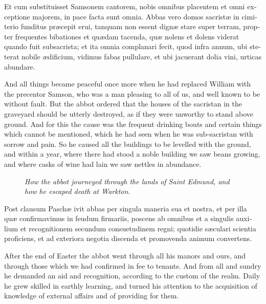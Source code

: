 \documentclass{book}
\newcommand{\blockhead}[4][]{
\begin{figure}
\centering
\vspace{#4}
\parbox{2.75cm}{\begin{center}\footnotesize \color{BrickRed} \emph{#2}\\ #1 \end{center}}
\end{figure}
}
\begin{document}
\begin{paracol}{2}
\switchcolumn*

\begin{otherlanguage}{latin}
Et cum substituisset Samsonem cantorem, nobis omnibus placentem et omni exceptione majorem, in pace facta sunt omnia. Abbas vero domos sacrist\ae{} in cimiterio funditus pr\ae{}cepit erui, tanquam non essent dign\ae{} stare super terram, propter frequentes bibationes et qu\ae{}dam tacenda, qu\ae{} nolens et dolens viderat quando fuit subsacrista; et ita omnia complanari fecit, quod infra annum, ubi steterat nobile \ae{}dificium, vidimus fabas pullulare, et ubi jacuerant dolia vini, urticas abundare.
\end{otherlanguage}

\switchcolumn

And all things became peaceful once more when he had replaced William with the precentor Samson, who was a man pleasing to all of us, and well known to be without fault. But the abbot ordered that the houses of the sacristan in the graveyard should be utterly destroyed, as if they were unworthy to stand above ground. And for this the cause was the frequent drinking bouts and certain things which cannot be mentioned, which he had seen when he was sub-sacristan with sorrow and pain. So he caused all the buildings to be levelled with the ground, and within a year, where there had stood a noble building we saw beans growing, and where casks of wine had lain we saw nettles in abundance.

\switchcolumn*

\begin{otherlanguage}{latin}
\blockhead{How the abbot journeyed through the lands of Saint Edmund, and how he escaped death at Warkton.}{4}{-0.65cm}
Post clausum Pasch\ae{} ivit abbas per singula maneria sua et nostra, et per illa qu\ae{} confirmavimus in feudum firmariis, poscens ab omnibus et a singulis auxilium et recognitionem secundum consuetudinem regni; quotidie s\ae{}culari scientia proficiens, et ad exteriora negotia discenda et promovenda animum convertens.

\end{otherlanguage}

\switchcolumn

After the end of Easter the abbot went through all his manors and ours, and through those which we had confirmed in fee to tenants. And from all and sundry he demanded an aid and recognition, according to the custom of the realm. Daily he grew skilled in earthly learning, and turned his attention to the acquisition of knowledge of external affairs and of providing for them.


\end{paracol}
\end{document}
